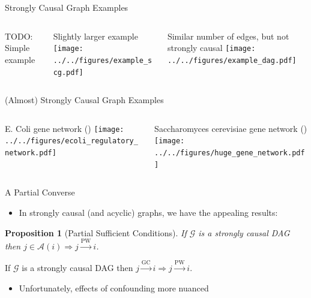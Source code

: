 \documentclass{beamer} %
\newtheorem*{proposition}{Proposition}
\def\gc{\overset{\text{GC}}{\rightarrow}}  %
\def\pwgc{\overset{\text{PW}}{\rightarrow}}  %
\def\gcg{\mathcal{G}}  %
\newcommand{\anc}[1]{\mathcal{A}(#1)}  %
\begin{document}
\begin{frame}{Strongly Causal Graph Examples}
  \begin{columns}
    \begin{column}{0.33\linewidth}
      TODO: Simple example\pause
    \end{column}
    \begin{column}{0.33\linewidth}
      \small{Slightly larger example}
      \texttt{[image: ../../figures/example\_scg.pdf]}\pause
    \end{column}
    \begin{column}{0.33\linewidth}
      \small{Similar number of edges, but not strongly causal}
      \texttt{[image: ../../figures/example\_dag.pdf]}
    \end{column}
  \end{columns}
\end{frame}

\begin{frame}{(Almost) Strongly Causal Graph Examples}
  \begin{columns}
    \begin{column}{0.5\linewidth}
      \small{E. Coli gene network \tiny{()}}
      \texttt{[image: ../../figures/ecoli\_regulatory\_network.pdf]}\pause
    \end{column}
    \begin{column}{0.5\linewidth}
      \small{Saccharomyces cerevisiae gene network \tiny{()}}
      \texttt{[image: ../../figures/huge\_gene\_network.pdf]}\pause
    \end{column}
  \end{columns}
\end{frame}

\begin{frame}{A Partial Converse}
  \begin{itemize}
    \item{In strongly causal (and acyclic) graphs, we have the appealing results:}
  \end{itemize}

  \begin{proposition}[Partial Sufficient Conditions]
    \label{prop:pwgc_anc}
    If $\gcg$ is a strongly causal DAG then $j \in \anc{i} \Rightarrow j \pwgc i$.
  \end{proposition}\pause

  \begin{corollary}
    \label{cor:gc_implies_pwgc}
    If $\gcg$ is a strongly causal DAG then $j \gc i \Rightarrow j \pwgc i$.
  \end{corollary}\pause

  \begin{itemize}
    \item{Unfortunately, effects of confounding more nuanced}\pause
  \end{itemize}
\end{frame}
\end{document}
